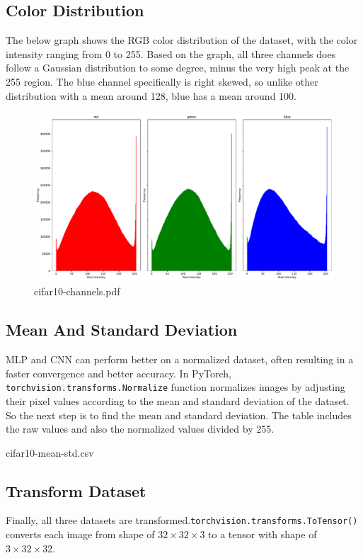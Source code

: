 \documentclass{report}
\begin{document}
\subsection{Color Distribution} 
The below graph shows the RGB color distribution of the dataset, with the color intensity ranging from 0 to 
255. Based on the graph, all three channels does follow a Gaussian distribution to some degree, minus the very 
high peak at the 255 region. The blue channel specifically is right skewed, so unlike other distribution with a 
mean around 128, blue has a mean around 100.

\begin{figure}[ht]
    \center
    \includegraphics[scale=0.4]{../output/cifar10-channels.pdf}
    \caption{cifar10-channels.pdf}
\end{figure}

\subsection{Mean And Standard Deviation} 
MLP and CNN can perform better on a normalized dataset, often resulting in a faster convergence and better 
accuracy. In PyTorch, \texttt{torchvision.transforms.Normalize} function normalizes images by adjusting their 
pixel values according to the mean and standard deviation of the dataset. So the next step is to find the mean 
and standard deviation. The table includes the raw values and also the normalized values divided by 255.

\begin{table}[ht]
    \center
    \caption{cifar10-mean-std.csv}
\end{table}

\subsection{Transform Dataset}
Finally, all three datasets are transformed.\texttt{torchvision.transforms.ToTensor()} converts each image from 
shape of $32\times32\times3$ to a tensor with shape of $3\times32\times32$.
\end{document}
